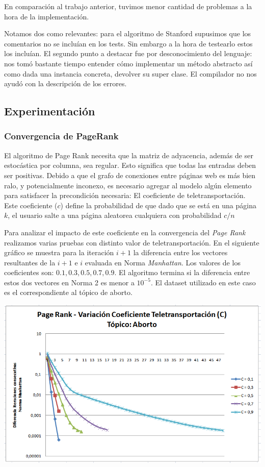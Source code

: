 	En comparación al trabajo anterior, tuvimos menor cantidad de problemas a la hora de la implementación. 

	Notamos dos como relevantes: para el algoritmo de Stanford supusimos que los comentarios no se incluían en los tests. Sin embargo a la hora de testearlo estos los incluían. El segundo punto a destacar fue por desconocimiento del lenguaje: nos tomó bastante tiempo entender cómo implementar un método abstracto así como dada una instancia concreta, devolver su super clase. El compilador no nos ayudó con la descripción de los errores.

\subsection{Experimentación}
\subsubsection{Convergencia de PageRank}
	
	El algoritmo de Page Rank necesita que la matriz de adyacencia, además de ser estocástica por columna, sea regular. Esto significa que todas las entradas deben ser positivas. Debido a que el grafo de conexiones entre páginas web es más bien ralo, y potencialmente inconexo, es necesario agregar al modelo algún elemento para satisfacer la precondición necesaria: El coeficiente de teletransportación. Este coeficiente ($c$) define la probabilidad de que dado que se está en una página $k$, el usuario salte a una página aleatorea cualquiera con probabilidad $c/n$

	Para analizar el impacto de este coeficiente en la convergencia del \textit{Page Rank} realizamos varias pruebas con distinto valor de teletransportación. En el siguiente gráfico se muestra para la iteración $i+1$ la diferencia entre los vectores resultantes de la $i+1$ e $i$ evaluada en Norma \textit{Manhattan}. Los valores de los coeficientes son: $0.1, 0.3, 0.5, 0.7, 0.9$. El algoritmo termina si la diferencia entre estos dos vectores en Norma 2 es menor a $10^{-5}$. El dataset utilizado en este caso es el correspondiente al tópico de aborto.

	\par 
	\begin{center}
		\includegraphics[scale=0.75]{./img/page_rank_variacion_coef_teletransportacion.png}
	\end{center}
	\par 

